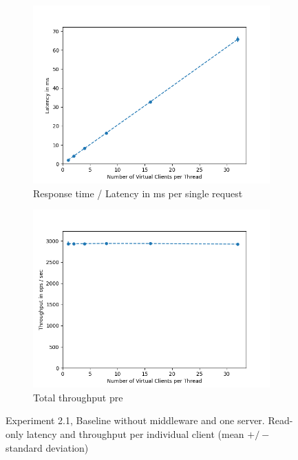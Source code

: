 \documentclass[11pt,a4paper]{article}
\begin{document}
\begin{figure}[H]
\centering
\begin{subfigure}{.5\textwidth}
    \centering
    \includegraphics[width=\textwidth]{img/exp2_1/exp2_1_latency_write_0.png}
    \caption{Response time / Latency in ms per single request}
    \label{fig:mesh1}
\end{subfigure}%
\begin{subfigure}{.5\textwidth}
      \centering
    \includegraphics[width=\textwidth]{img/exp2_1/exp2_1_throughput_write_0.png}
    \caption{Total throughput pre}
    \label{fig:mesh1}
\end{subfigure}
\caption{Experiment 2.1, Baseline without middleware and one server. Read-only latency and throughput per individual client (mean $+/-$ standard deviation)}
\label{fig:test}
\end{figure}
\end{document}
